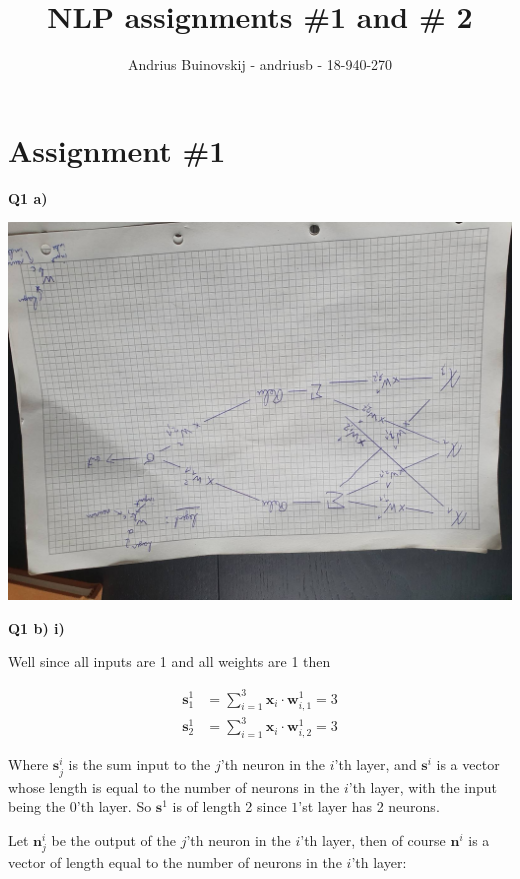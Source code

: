 \documentclass{article}
\begin{document}
\title{NLP assignments \#1 and \# 2}
\author{Andrius Buinovskij - andriusb - 18-940-270}
\date{}

\maketitle

\section{Assignment \#1}

\textbf{Q1 a)}

	\includegraphics[angle=90,width=\textwidth]{comp_graph}

\textbf{Q1 b) i)}
	
	Well since all inputs are 1 and all weights are 1 then
	
	\begin{align}
		\mathbf{s}^1_1 &= \sum^3_{i=1} \mathbf{x}_i\cdot \mathbf{w}^1_{i, 1} = 3\\
		\mathbf{s}^1_2 &= \sum^3_{i=1} \mathbf{x}_i\cdot \mathbf{w}^1_{i, 2} = 3
	\end{align}
	
	Where $\mathbf{s}^i_j$ is the sum input to the $j$'th neuron in the $i$'th layer, and $\mathbf{s}^i$ is a vector whose length is equal to the number of neurons in the $i$'th layer, with the input being the $0$'th layer. So $\mathbf{s}^1$ is of length 2 since $1$'st layer has 2 neurons. 
	
	Let $\mathbf{n}^i_j$ be the output of the $j$'th neuron in the $i$'th layer, then of course $\mathbf{n}^i$ is a vector of length equal to the number of neurons in the $i$'th layer:
	
\end{document}
